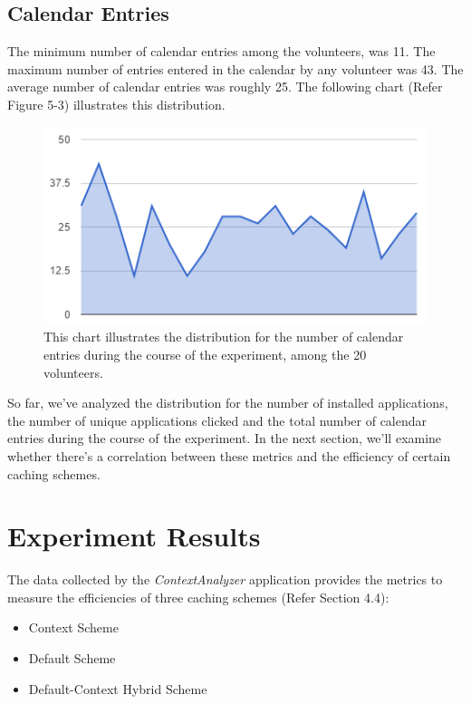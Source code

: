 \documentclass[12pt]{uthesis-v12}  %
\begin{document}
			\subsection{Calendar Entries}
				The minimum number of calendar entries among the volunteers, was 11. The maximum number of entries entered in the calendar by any volunteer was 43. The average number of calendar entries was roughly 25. The following chart (Refer Figure 5-3) illustrates this distribution.
				
				\begin{figure}[h]
					\centering
					\includegraphics[width = 130mm]{images/calendarEntries.png}
					\caption[Distribution of Number of Calendar Entries]{This chart illustrates the distribution for the number of calendar entries during the course of the experiment, among the 20 volunteers.}
				\end{figure}		
			
			So far, we've analyzed the distribution for the number of installed applications, the number of unique applications clicked and the total number of calendar entries during the course of the experiment. In the next section, we'll examine whether there's a correlation between these metrics and the efficiency of certain caching schemes.
			
		\section{Experiment Results}
			The data collected by the {\em ContextAnalyzer} application provides the metrics to measure the efficiencies of three caching schemes (Refer Section 4.4):
			
			\begin{itemize}
				\item Context Scheme
				\item Default Scheme
				\item Default-Context Hybrid Scheme
			\end{itemize}
			
\end{document}

